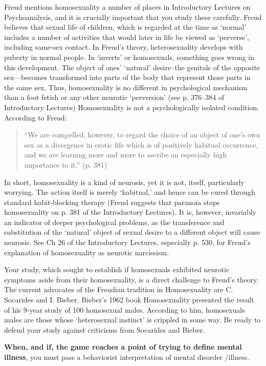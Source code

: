 \begin{refsection}
Freud mentions homosexuality a number of places in Introductory Lectures on Psychoanalysis, and it is crucially important that you study these carefully. Freud believes that sexual life of children, which is regarded at the time as `normal' includes a number of activities that would later in life be viewed as `perverse', including same-sex contact. In Freud's theory, heterosexuality develops with puberty in normal people. In `inverts' or homosexuals, something goes wrong in this development. The object of ones' `natural' desire--the genitals of the opposite sex---becomes transformed into parts of the body that represent those parts in the same sex. Thus, homosexuality is no different in psychological mechanism than a foot fetish or any other neurotic `perversion' (see p. 376--384 of Introductory Lectures) Homosexuality is not a psychologically isolated condition. According to Freud:

\begin{quote}

``We are compelled, however, to regard the choice of an object of one's own sex as a divergence in erotic life which is of positively habitual occurrence, and we are learning more and more to ascribe an especially high importance to it.'' (p. 381)
\end{quote}

In short, homosexuality is a kind of neurosis, yet it is not, itself, particularly worrying. The action itself is merely `habitual,' and hence can be cured through standard habit-blocking therapy (Freud suggests that paranoia stops homosexuality on p. 381 of the Introductory Lectures). It is, however, invariably an indicator of deeper psychological problems, as the transference and substitution of the `natural' object of sexual desire to a different object will cause neurosis. See Ch 26 of the Introductory Lectures, especially p. 530, for Freud's explanation of homosexuality as neurotic narcissism.

Your study, which sought to establish if homosexuals exhibited neurotic symptoms aside from their homosexuality, is a direct challenge to Freud's theory. The current advocates of the Freudian tradition in Homosexuality are C. Socarides and I. Bieber. Bieber's 1962 book Homosexuality presented the result of his 9-year study of 100 homosexual males. According to him, homosexuals males are those whose `heterosexual instinct' is crippled in some way. Be ready to defend your study against criticisms from Socarides and Bieber.

\textbf{When, and if, the game reaches a point of trying to define mental illness}, you must pass a behaviorist interpretation of mental disorder \slash  illness.


\end{refsection}
